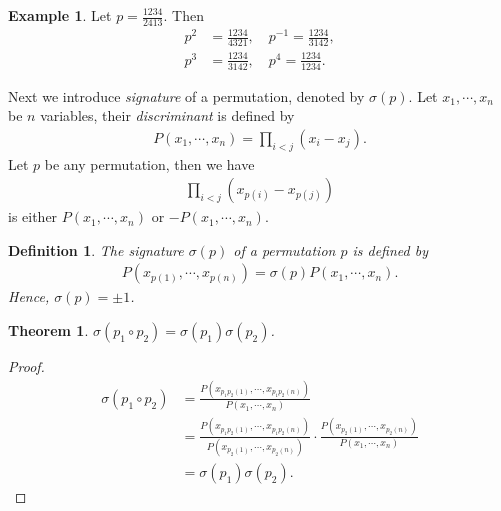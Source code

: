 \documentclass[10pt]{book}
\newtheorem{definition}{Definition}[chapter]
\newtheorem{theorem}{Theorem}[chapter]
\theoremstyle{definition}
\newtheorem{example}{Example}[chapter]
\numberwithin{equation}{chapter}
\begin{document}
\medskip

\begin{example}
Let $p = \frac{1234}{2413}$. Then
\begin{align*}
    p^2 & = \frac{1234}{4321},\quad p^{-1} = \frac{1234}{3142}, \\
    p^3 & = \frac{1234}{3142},\quad p^{4} = \frac{1234}{1234}.
\end{align*}
\end{example}

\medskip

Next we introduce \emph{signature} of a permutation, denoted by $\sigma(p)$. Let $x_1,\cdots,x_n$ be $n$ variables, their \emph{discriminant} is defined by 
\begin{align*}
    P(x_1,\cdots,x_n) = \prod_{i < j}(x_i - x_j).
\end{align*}
Let $p$ be any permutation, then we have 
\begin{align*}
    \prod_{i < j}\left(x_{p(i)} - x_{p(j)} \right)
\end{align*}
is either $P(x_1,\cdots,x_n)$ or $- P(x_1,\cdots,x_n)$.

\medskip

\begin{definition}
The signature $\sigma(p)$  of a permutation $p$ is defined by
\begin{align*}
    P\left(x_{p(1)},\cdots,x_{p(n)}\right) = \sigma(p) P(x_1,\cdots,x_n).
\end{align*}
Hence, $\sigma(p) = \pm 1$.
\end{definition}

\medskip

\begin{theorem}
$\sigma(p_1\circ p_2) = \sigma(p_1) \sigma(p_2)$.
\end{theorem}
\begin{proof}
\begin{align*}
    \sigma(p_1\circ p_2) & = \frac{P\left(x_{p_1p_2(1)},\cdots,x_{p_1p_2(n)}\right)}{P(x_1,\cdots,x_n)} \\
    & = \frac{P\left(x_{p_1p_2(1)},\cdots,x_{p_1p_2(n)}\right)}{P(x_{p_2(1)},\cdots,x_{p_2(n)})}\cdot \frac{P\left(x_{p_2(1)},\cdots,x_{p_2(n)}\right)}{P(x_1,\cdots,x_n)}\\
    & = \sigma(p_1) \sigma(p_2).
\end{align*}
\end{proof}

\medskip
\end{document}
